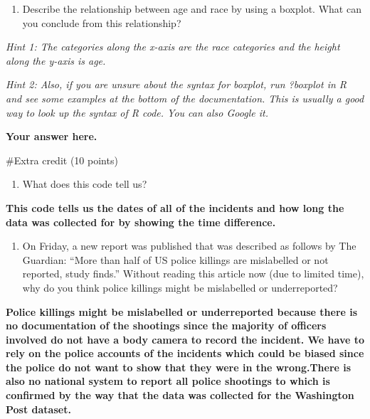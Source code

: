 \documentclass[
]{article}
\newenvironment{Shaded}{\begin{snugshade}}{\end{snugshade}}
\newcommand{\DecValTok}[1]{\textcolor[rgb]{0.00,0.00,0.81}{#1}}
\newcommand{\FunctionTok}[1]{\textcolor[rgb]{0.00,0.00,0.00}{#1}}
\newcommand{\NormalTok}[1]{#1}
\newcommand{\OtherTok}[1]{\textcolor[rgb]{0.56,0.35,0.01}{#1}}
\newcommand{\SpecialCharTok}[1]{\textcolor[rgb]{0.00,0.00,0.00}{#1}}
\providecommand{\tightlist}{%
  \setlength{\itemsep}{0pt}\setlength{\parskip}{0pt}}
\begin{document}
\begin{enumerate}
\def\labelenumi{\alph{enumi}.}
\setcounter{enumi}{1}
\tightlist
\item
  Describe the relationship between age and race by using a boxplot.
  What can you conclude from this relationship?
\end{enumerate}

\emph{Hint 1: The categories along the x-axis are the race categories
and the height along the y-axis is age.}

\emph{Hint 2: Also, if you are unsure about the syntax for boxplot, run
?boxplot in R and see some examples at the bottom of the documentation.
This is usually a good way to look up the syntax of R code. You can also
Google it.}

\textbf{Your answer here.}

\#Extra credit (10 points)

\begin{enumerate}
\def\labelenumi{\alph{enumi}.}
\tightlist
\item
  What does this code tell us?
\end{enumerate}

\begin{Shaded}
\end{Shaded}

\textbf{This code tells us the dates of all of the incidents and how
long the data was collected for by showing the time difference.}

\begin{enumerate}
\def\labelenumi{\alph{enumi}.}
\setcounter{enumi}{1}
\tightlist
\item
  On Friday, a new report was published that was described as follows by
  The Guardian: ``More than half of US police killings are mislabelled
  or not reported, study finds.'' Without reading this article now (due
  to limited time), why do you think police killings might be
  mislabelled or underreported?
\end{enumerate}

\textbf{Police killings might be mislabelled or underreported because
there is no documentation of the shootings since the majority of
officers involved do not have a body camera to record the incident. We
have to rely on the police accounts of the incidents which could be
biased since the police do not want to show that they were in the
wrong.There is also no national system to report all police shootings to
which is confirmed by the way that the data was collected for the
Washington Post dataset.}
\end{document}
